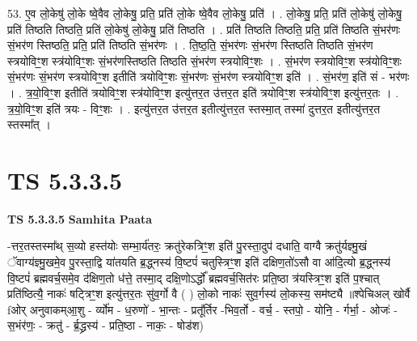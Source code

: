 \documentclass[17pt]{extarticle}
\begin{document}
53. ए॒व लो॒केषु॑ लो॒के ष्वे॒वैव लो॒केषु॒ प्रति॒ प्रति॑ लो॒के ष्वे॒वैव लो॒केषु॒ प्रति॑ । . लो॒केषु॒ प्रति॒ प्रति॑ लो॒केषु॑ लो॒केषु॒ प्रति॑ तिष्ठति तिष्ठति॒ प्रति॑ लो॒केषु॑ लो॒केषु॒ प्रति॑ तिष्ठति । . प्रति॑ तिष्ठति तिष्ठति॒ प्रति॒ प्रति॑ तिष्ठति सं॒भर॑णः सं॒भर॑ण स्तिष्ठति॒ प्रति॒ प्रति॑ तिष्ठति सं॒भर॑णः । . ति॒ष्ठ॒ति॒ सं॒भर॑णः सं॒भर॑ण स्तिष्ठति तिष्ठति सं॒भर॑ण स्त्रयोविꣳ॒॒श 
स्त्र॑योविꣳ॒॒शः सं॒भर॑णस्तिष्ठति तिष्ठति सं॒भर॑ण स्त्रयोविꣳ॒॒शः । . सं॒भर॑ण स्त्रयोविꣳ॒॒श स्त्र॑योविꣳ॒॒शः सं॒भर॑णः सं॒भर॑ण स्त्रयोविꣳ॒॒श इतीति॑ त्रयोविꣳ॒॒शः सं॒भर॑णः सं॒भर॑ण स्त्रयोविꣳ॒॒श इति॑ । . सं॒भर॑ण॒ इति॑ सं - भर॑णः । . त्र॒यो॒विꣳ॒॒श इतीति॑ त्रयोविꣳ॒॒श स्त्र॑योविꣳ॒॒श इत्यु॑त्तर॒त उ॑त्तर॒त इति॑ त्रयोविꣳ॒॒श स्त्र॑योविꣳ॒॒श इत्यु॑त्तर॒तः । . त्र॒यो॒विꣳ॒॒श इति॑ त्रयः - विꣳ॒॒शः । . इत्यु॑त्तर॒त उ॑त्तर॒त इतीत्यु॑त्तर॒त स्तस्मा॒त् तस्मा॑ दुत्तर॒त इतीत्यु॑त्तर॒त स्तस्मा᳚त् । \newline
\pagebreak
{}

\section{ TS 5.3.3.5 }

\textbf{TS 5.3.3.5 } \newline
\textbf{Samhita Paata} \newline

-त्तर॒तस्तस्मा᳚थ् स॒व्यो हस्त॑योः सम्भा॒र्य॑तरः॒ क्रतु॑रेकत्रिꣳ॒॒श इति॑ पु॒रस्ता॒दुप॑ दधाति॒ वाग्वै क्रतु॑र्यज्ञ्मु॒खं ॅवाग्य॑ज्ञ्मु॒खमे॒व पु॒रस्ता॒द्वि या॑तयति ब्र॒द्ध्नस्य॑ वि॒ष्टपं॑ चतुस्त्रिꣳ॒॒श इति॑ दक्षिण॒तो॑ऽसौ वा आ॑दि॒त्यो ब्र॒द्ध्नस्य॑ वि॒ष्टपं॑ ब्रह्मवर्च॒समे॒व द॑क्षिण॒तो ध॑त्ते॒ तस्मा॒द् दक्षि॒णोऽर्द्धो᳚ ब्रह्मवर्च॒सित॑रः प्रति॒ष्ठा त्र॑यस्त्रिꣳ॒॒श इति॑ प॒श्चात् प्रति॑ष्ठित्यै॒ नाकः॑ षट्त्रिꣳ॒॒श इत्यु॑त्तर॒तः सु॑व॒र्गो वै ( ) लो॒को नाकः॑ सुव॒र्गस्य॑ लो॒कस्य॒ सम॑ष्ट्यै ॥श्पेचिअल् खोर्वै fओर् अनुवाकम्आ॒शु - र्व्यो॑म - ध॒रुणो॑ - भा॒न्तः - प्रतू᳚र्तिर -भिव॒र्तो - वर्च॒ - स्तपो॒ - योनि॒ - र्गर्भा॒ - ओजः॑ - स॒भंर॑णः॒ - क्रतु॑ - र्ब्र॒द्ध्रस्य॑ - प्रति॒ष्ठा - नाकः॒ - षोड॑श) \newline
\end{document}
